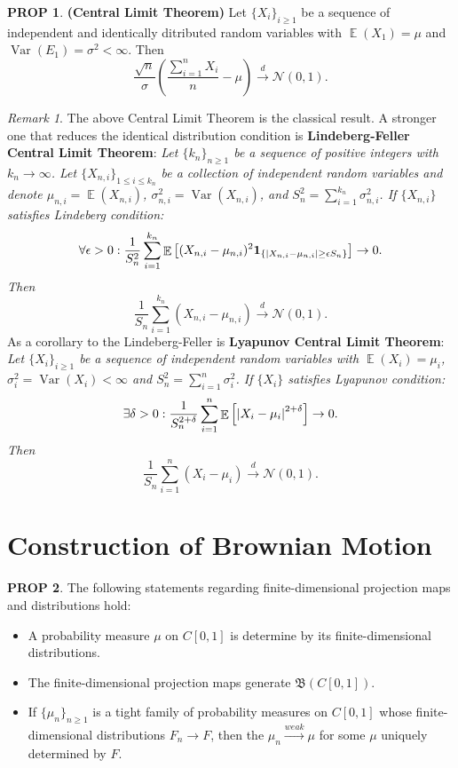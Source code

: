 \documentclass[hidelinks,11pt]{article}
\theoremstyle{definition}
\theoremstyle{dotless}
\newtheorem{prop}{PROP}[section]
\theoremstyle{remark}
\newtheorem*{remark}{Remark}
\DeclareMathOperator{\Var}{Var}
\DeclareMathOperator{\E}{\mathbb{E}}
\DeclareMathOperator{\1}{\mathbf{1}}
\begin{document}
\begin{prop}\textup{\textbf{(Central Limit Theorem)}} Let $\{X_i\}_{i\geq1}$ be a sequence of independent and identically ditributed random variables with $\E(X_1)=\mu$ and $\Var(E_1)=\sigma^2<\infty$. Then
\[\frac{\sqrt{n}}{\sigma}\left(\frac{\sum_{i=1}^nX_i}{n}-\mu\right)\xrightarrow{d}\mathcal{N}(0,1).\]
\end{prop}

\begin{remark}
The above Central Limit Theorem is the classical result. A stronger one that reduces the identical distribution condition is \textbf{Lindeberg-Feller Central Limit Theorem}:\medbreak
\textit{Let $\{k_n\}_{n\geq1}$ be a sequence of positive integers with $k_n\to\infty$. Let $\{X_{n,i}\}_{1\leq i\leq k_n}$ be a collection of independent random variables and denote $\mu_{n,i}=\E(X_{n,i})$, $\sigma_{n,i}^2=\Var(X_{n,i})$, and $S_n^2=\sum_{i=1}^{k_n}\sigma_{n,i}^2$. If $\{X_{n,i}\}$ satisfies Lindeberg condition:}
\[\forall\epsilon>0:\frac{1}{S_n^2}\sum_{i=1}^{k_n}\E\left[(X_{n,i}-\mu_{n,i})^2\textbf{1}_{\{\abs{X_{n,i}-\mu_{n,i}}\geq\epsilon S_n\}}\right]\to0.\]
\textit{Then}
\[\frac{1}{S_n}\sum_{i=1}^{k_n}(X_{n,i}-\mu_{n,i})\xrightarrow{d}\mathcal{N}(0,1).\]
As a corollary to the Lindeberg-Feller is \textbf{Lyapunov Central Limit Theorem}:\medbreak
\textit{Let $\{X_i\}_{i\geq1}$ be a sequence of independent random variables with $\E(X_i)=\mu_i$, $\sigma_i^2=\Var(X_i)<\infty$ and $S_n^2=\sum_{i=1}^n\sigma_i^2$. If $\{X_i\}$ satisfies Lyapunov condition:}
\[\exists\delta>0:\frac{1}{S_n^{2+\delta}}\sum_{i=1}^n\E\left[\abs{X_i-\mu_i}^{2+\delta}\right]\to0.\]
\textit{Then}
\[\frac{1}{S_n}\sum_{i=1}^n(X_i-\mu_i)\xrightarrow{d}\mathcal{N}(0,1).\]
\end{remark}

\newpage
\section{Construction of Brownian Motion}

\begin{prop}
The following statements regarding finite-dimensional projection maps and distributions hold:\begin{itemize}
    \item A probability measure $\mu$ on $C[0,1]$ is determine by its finite-dimensional distributions.
    \item The finite-dimensional projection maps generate $\mathfrak{B}(C[0,1])$.
    \item If $\{\mu_n\}_{n\geq1}$ is a tight family of probability measures on $C[0,1]$ whose finite-dimensional distributions $F_n\to F$, then the $\mu_n\xrightarrow{weak}\mu$ for some $\mu$ uniquely determined by $F$.
\end{itemize}
\end{prop}
\end{document}
